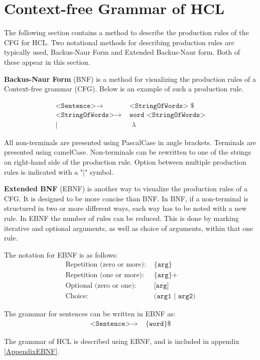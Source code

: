 \section{Context-free Grammar of HCL}
\label{CFGdescription}
The following section contains a method to describe the production rules of the CFG for HCL.
Two notational methods for describing production rules are typically used, Backus-Naur Form and Extended Backus-Naur form. 
Both of these appear in this section.

\textbf{Backus-Naur Form} (BNF) is a method for visualizing the production rules of a Context-free grammar (CFG).
Below is an example of such a production rule.

\begin{align*}
	\texttt{<Sentence>}\to & \texttt{ <StringOfWords> \$}\\
	\texttt{<StringOfWords>}\to & \texttt{ word <StringOfWords>}\\
	| & \texttt{ }\lambda
\end{align*}

All non-terminals are presented using PascalCase in angle brackets.
Terminals are presented using camelCase.
Non-terminals can be rewritten to one of the strings on right-hand side of the production rule.
Option between multiple production rules is indicated with a "|" symbol.

\textbf{Extended BNF} (EBNF) is another way to visualize the production rules of a CFG.
It is designed to be more concise than BNF.
In BNF, if a non-terminal is structured in two or more different ways, each way has to be noted with a new rule.
In EBNF the number of rules can be reduced.
This is done by marking iterative and optional arguments, as well as choice of arguments, within that one rule.
\cite{SebestaEBNF}

The notation for EBNF is as follows:
\begin{align*}
	\text{Repetition (zero or more):} & \texttt{ \{arg\}}\\
	\text{Repetition (one or more):} & \texttt{ \{arg\}+}\\
	\text{Optional (zero or one):} & \texttt{ [arg]}\\
	\text{Choice:} & \texttt{ (arg1 | arg2)}
\end{align*}

The grammar for sentences can be written in EBNF as:
\begin{align*}
	\texttt{<Sentence>}\to & \texttt{ \{word\} \$}
\end{align*}

The grammar of HCL is described using EBNF, and is included in appendix \ref{AppendixEBNF}.
